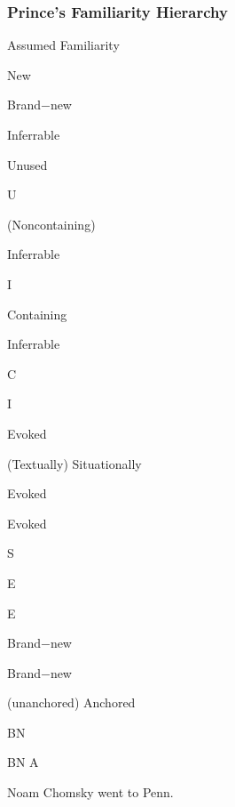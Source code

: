 \documentclass[compress,color=usenames]{beamer}
\begin{document}
\begin{frame}
\frametitle{
Prince's Familiarity Hierarchy}



Assumed Familiarity






New






Brand$-$new






Inferrable






Unused



U






(Noncontaining)



Inferrable



I






Containing



Inferrable



C



I






Evoked






(Textually) Situationally



Evoked



Evoked



S



E



E






Brand$-$new



Brand$-$new



(unanchored) Anchored



BN



BN A






Noam Chomsky went to Penn.










\end{frame}
\end{document}
